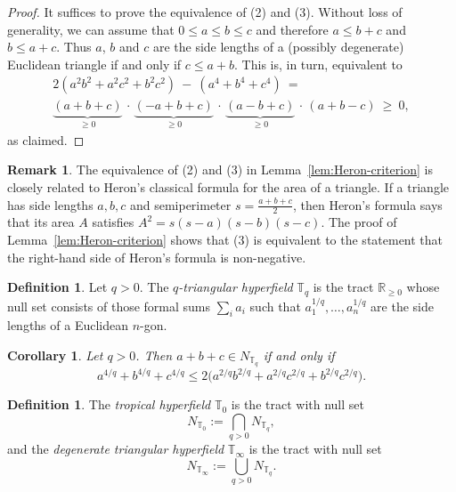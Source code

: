 \documentclass[12pt]{amsart}
\newtheorem{corollary}[theorem]{Corollary}
\theoremstyle{definition}
\newtheorem{definition}[theorem]{Definition}
\newtheorem{remark}[theorem]{Remark}
\newcommand{\1}{\mathbf{1}}
\newcommand\R{{\mathbb R}}
\newcommand\T{{\mathbb T}}
\renewcommand\geq{\geqslant}
\renewcommand\leq{\leqslant}
\newcommand\mb{\texorpdfstring{\textbf{Matt:} }{Matt: }}
\newcommand\ol{\texorpdfstring{\textbf{Oliver:} }{Oliver: }}
\begin{document}
\begin{proof}
It suffices to prove the equivalence of (2) and (3).
Without loss of generality, we can assume that $0\leq a\leq b\leq c$ and therefore $a\leq b+c$ and $b\leq a+c$. Thus $a$, $b$ and $c$ are the side lengths of a (possibly degenerate) Euclidean triangle if and only if $c\leq a+b$. This is, in turn, equivalent to
 \begin{multline*}
  2(a^2b^2+a^2c^2+b^2c^2) \ - \ (a^4+b^4+c^4) \ = \\ 
  \underbrace{(a+b+c)}_{\geq0} \,\cdot\, \underbrace{(-a+b+c)}_{\geq0} \,\cdot\, \underbrace{(a-b+c)}_{\geq0} \,\cdot\, (a+b-c) \ \geq \ 0,
 \end{multline*}
 as claimed.
\end{proof}

\begin{remark}
The equivalence of (2) and (3) in Lemma~\ref{lem:Heron-criterion} is
closely related to Heron's classical formula for the area of a triangle.
If a triangle has side lengths $a,b,c$ and semiperimeter
$s=\frac{a+b+c}{2}$, then Heron's formula says that its area $A$ satisfies
$A^2=s(s-a)(s-b)(s-c)$.
The proof of Lemma~\ref{lem:Heron-criterion} shows that (3) is equivalent to the statement that the right-hand side of Heron's formula is non-negative.
\end{remark}


\begin{definition}
Let $q>0$. The \emph{$q$-triangular hyperfield} $\T_q$ is the tract $\R_{\ge 0}$
whose null set consists of those formal sums $\sum_i a_i$ such that
$a_1^{1/q},\dots,a_n^{1/q}$ are the side lengths of a Euclidean $n$-gon.
\end{definition}

\begin{corollary}
\label{cor:Tq-Heron}
Let $q>0$. Then $a+b+c\in N_{\T_q}$ if and only if
\[
a^{4/q}+b^{4/q}+c^{4/q}
\le
2\bigl(a^{2/q}b^{2/q}+a^{2/q}c^{2/q}+b^{2/q}c^{2/q}\bigr).
\]
\end{corollary}

\begin{definition}
The \emph{tropical hyperfield} $\T_0$ is the tract with null set
\[
N_{\T_0}:=\bigcap_{q>0} N_{\T_q},
\]
and the \emph{degenerate triangular hyperfield} $\T_\infty$ is the tract with null set
\[
N_{\T_\infty}:=\bigcup_{q>0} N_{\T_q}.
\]
\end{definition}
\end{document}

